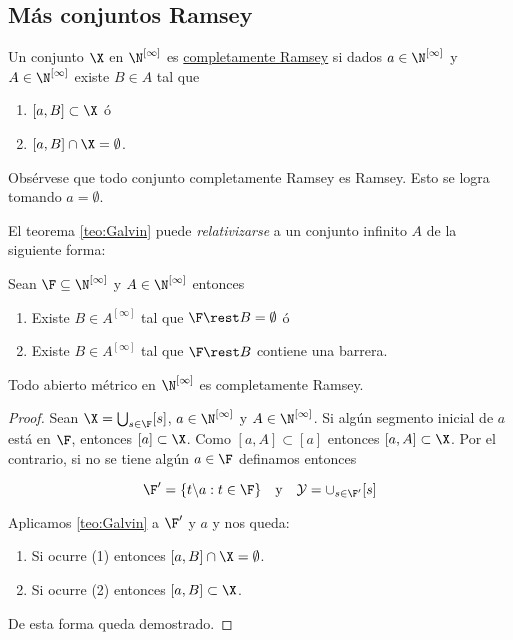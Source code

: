 \subsection{Más conjuntos Ramsey}

\begin{defn}
    Un conjunto $\X$ en $\N^{[\infty]}$ es \ul{completamente Ramsey} si dados $a \in \N^{[\infty]}$ y $A \in \N^{[\infty]}$ existe $B \in A$ tal que
    
    \begin{enumerate}
        \item $[a, B] \subset \X$ ó
        \item $[a, B] \cap \X = \emptyset$.
    \end{enumerate}
\end{defn}

\begin{nota}
    Obsérvese que todo conjunto completamente Ramsey es Ramsey. Esto se logra tomando $a = \emptyset$.
\end{nota}

El teorema \ref{teo:Galvin} puede \textit{relativizarse} a un conjunto infinito $A$ de la siguiente forma:

\begin{teo}
    Sean $\F \subseteq \N^{[\infty]}$ y $A \in \N^{[\infty]}$ entonces
    
    \begin{enumerate}
        \item Existe $B \in A^{[\infty]}$ tal que $\F \rest B = \emptyset$ ó
        \item Existe $B \in A^{[\infty]}$ tal que $\F \rest B$ contiene una barrera.
    \end{enumerate}
\end{teo}

\begin{teo}
    Todo abierto métrico en $\N^{[\infty]}$ es completamente Ramsey.
\end{teo}

\begin{proof}
    Sean $\X = \bigcup_{s \in \F} [s]$, $a \in \N^{[\infty]}$ y $A \in \N^{[\infty]}$. Si algún segmento inicial de $a$ está en $\F$, entonces $[a] \subset \X$. Como $[a, A] \subset [a]$ entonces $[a,A] \subset \X$. Por el contrario, si no se tiene algún $a \in \F$ definamos entonces
    
    \[
    \F' = \{t \backslash a : t \in \F\} \quad \text{y} \quad \mathcal{Y} = \cup_{s \in \F'} [s]
    \]
    
    Aplicamos \ref{teo:Galvin} a $\F'$ y $a$ y nos queda:
    
    \begin{enumerate}
        \item Si ocurre (1) entonces $[a,B] \cap \X = \emptyset$.
        \item Si ocurre (2) entonces $[a,B] \subset \X$.
    \end{enumerate}
    
    De esta forma queda demostrado.
\end{proof}

